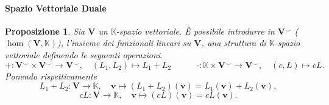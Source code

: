 \documentclass{article}
\theoremstyle{plain}
\newtheorem{prop}[thm]{Proposizione}
\theoremstyle{definition}
\theoremstyle{remark}
\begin{document}
\paragraph{Spazio Vettoriale Duale}
\begin{bxthm}
\begin{prop}
Sia $\mathbf{V}$ un $\mathbb{K}$-spazio vettoriale. È possibile introdurre in $\mathbf{V}^\smallsmile$ ($\hom(\mathbf{V},\mathbb{K})$), l'insieme dei funzionali lineari su $\mathbf{V}$, una struttura di $\mathbb{K}$-spazio vettoriale definendo le seguenti operazioni.
\[+:\mathbf{V}^\smallsmile\times\mathbf{V}^\smallsmile\to\mathbf{V}^\smallsmile,\quad (L_1,L_2)\mapsto L_1+L_2\quad\quad\quad \cdot:\mathbb{K}\times\mathbf{V}^\smallsmile\to\mathbf{V}^\smallsmile,\quad (c,L)\mapsto cL.\]
Ponendo rispettivamente
\[L_1+L_2:\mathbf{V}\to\mathbb{K},\quad \mathbf{v}\mapsto(L_1+L_2)(\mathbf{v})=L_1(\mathbf{v})+L_2(\mathbf{v}),\]
\[cL:\mathbf{V}\to\mathbb{K},\quad \mathbf{v}\mapsto(cL)(\mathbf{v})=cL(\mathbf{v}).\]    
\end{prop}
\end{bxthm}
\end{document}
